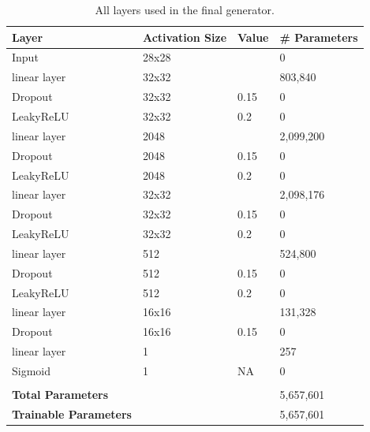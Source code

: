 \documentclass[12pt, fleqn, titlepage]{article}
\begin{document}
\begin{table}[H]
	\centering
	\begin{tabular}{llll}\toprule
		Layer                        & Activation Size & Value & \# Parameters \\ \midrule
		Input                        & 28x28           &       & 0             \\
		linear layer                 & 32x32           &       & 803,840       \\
		Dropout                      & 32x32           & 0.15  & 0             \\
		LeakyReLU                    & 32x32           & 0.2   & 0             \\
		linear layer                 & 2048            &       & 2,099,200     \\
		Dropout                      & 2048            & 0.15  & 0             \\
		LeakyReLU                    & 2048            & 0.2   & 0             \\
		linear layer                 & 32x32           &       & 2,098,176     \\
		Dropout                      & 32x32           & 0.15  & 0             \\
		LeakyReLU                    & 32x32           & 0.2   & 0             \\
		linear layer                 & 512             &       & 524,800       \\
		Dropout                      & 512             & 0.15  & 0             \\
		LeakyReLU                    & 512             & 0.2   & 0             \\
		linear layer                 & 16x16           &       & 131,328       \\
		Dropout                      & 16x16           & 0.15  & 0             \\
		linear layer                 & 1               &       & 257           \\
		Sigmoid                      & 1               & NA    & 0             \\
		                             &                 &       &               \\
		\textbf{Total Parameters}    &                 &       & 5,657,601     \\
		\textbf{Trainable Parameters}&                 &       & 5,657,601     \\ \bottomrule
	\end{tabular}
	\caption{All layers used in the final generator.}
	\label{tab:gan_discriminator}
\end{table}
\end{document}

